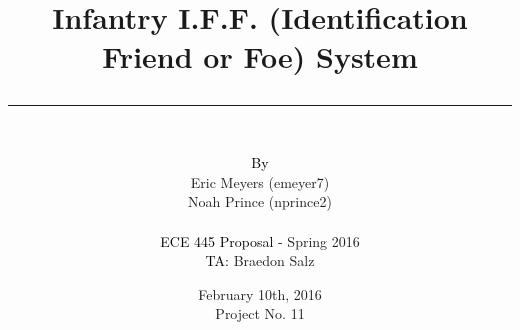 \documentclass[openbib,letterpaper,10pt]{article}
\author{\vspace{.4in}\\
	\textcolor{black}{By}\\
	#1
	\vspace{1in}\\
	\textcolor{black}{ECE 445 Proposal -} #2\\
	\textcolor{black}{TA:} #3
	\vspace{1in}}
\newcommand{\thetitle}[1]{\title{\begin{LARGE}{\bf #1}\end{LARGE} \color{subtitlecolor}\rule[25pt]{\textwidth}{1pt}}}
\newcommand{\theauthor}[3]{
	\author{\vspace{.4in}\\
	\textcolor{black}{By}\\
	#1
	\vspace{1in}\\
	\textcolor{black}{ECE 445 Proposal -} #2\\
	\textcolor{black}{TA:} #3
	\vspace{1in}}
}
\begin{document}
\pagestyle{empty}
\doublespacing

\thetitle{{Infantry I.F.F. (Identification Friend or Foe) System}}

\theauthor{
	{Eric Meyers (emeyer7)}\\
	{Noah Prince (nprince2)}\\
}
{ %
	{Spring 2016}
}
{ %
	{Braedon Salz}
}

\date{
{February 10th, 2016}\\
Project No. 11
\clearpage
}
\end{document}
